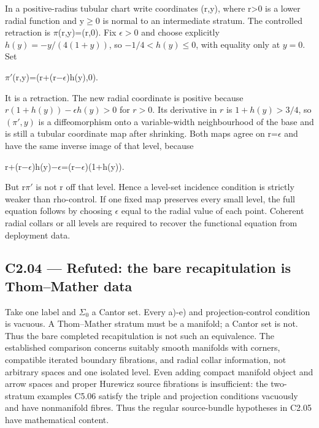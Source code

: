 In a positive-radius tubular chart write coordinates (r,y), where r\textgreater0 is a lower radial function and y\ensuremath{\ge}0 is normal to an intermediate stratum. The controlled retraction is \ensuremath{\pi}(r,y)=(r,0). Fix \(\epsilon>0\) and choose explicitly \(h(y)=-y/(4(1+y))\), so \(-1/4<h(y)\le0\), with equality only at \(y=0\). Set

\ensuremath{\pi}\ensuremath{\prime}(r,y)=(r+(r\ensuremath{-}\ensuremath{\epsilon})h(y),0).

It is a retraction. The new radial coordinate is positive because \(r(1+h(y))-\epsilon h(y)>0\) for \(r>0\). Its derivative in \(r\) is \(1+h(y)>3/4\), so \((\pi\prime,y)\) is a diffeomorphism onto a variable-width neighbourhood of the base and is still a tubular coordinate map after shrinking. Both maps agree on r=\ensuremath{\epsilon} and have the same inverse image of that level, because

r+(r\ensuremath{-}\ensuremath{\epsilon})h(y)\ensuremath{-}\ensuremath{\epsilon}=(r\ensuremath{-}\ensuremath{\epsilon})(1+h(y)).

But r\ensuremath{\pi}\ensuremath{\prime} is not r off that level. Hence a level-set incidence condition is strictly weaker than rho-control. If one fixed map preserves every small level, the full equation follows by choosing \ensuremath{\epsilon} equal to the radial value of each point. Coherent radial collars or all levels are required to recover the functional equation from deployment data.

\subsection{C2.04 --- Refuted: the bare recapitulation is Thom--Mather data}\label{c2.04-refuted-the-bare-recapitulation-is-thommather-data}

Take one label and \ensuremath{\Sigma}\ensuremath{{}_{0}} a Cantor set. Every a)-e) and projection-control condition is vacuous. A Thom--Mather stratum must be a manifold; a Cantor set is not. Thus the bare completed recapitulation is not such an equivalence. The established comparison concerns suitably smooth manifolds with corners, compatible iterated boundary fibrations, and radial collar information, not arbitrary spaces and one isolated level. Even adding compact manifold object and arrow spaces and proper Hurewicz source fibrations is insufficient: the two-stratum examples C5.06 satisfy the triple and projection conditions vacuously and have nonmanifold fibres. Thus the regular source-bundle hypotheses in C2.05 have mathematical content.

